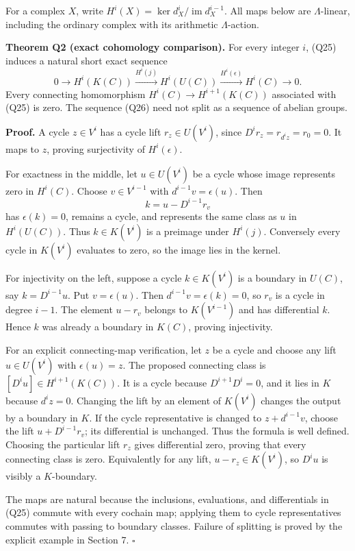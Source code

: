 \documentclass[
]{article}
\begin{document}
For a complex \(X\), write
\(H^i(X)=\ker d_X^i/\operatorname{im}d_X^{i-1}\). All maps below are
\(\Lambda\)-linear, including the ordinary complex with its arithmetic
\(\Lambda\)-action.

\textbf{Theorem Q2 (exact cohomology comparison).} For every integer
\(i\), (Q25) induces a natural short exact sequence \[
0\longrightarrow H^i(K(C))\xrightarrow{H^i(j)}H^i(U(C))
\xrightarrow{H^i(\epsilon)}H^i(C)\longrightarrow0.
\tag{Q26}
\] Every connecting homomorphism \(H^i(C)\to H^{i+1}(K(C))\) associated
with (Q25) is zero. The sequence (Q26) need not split as a sequence of
abelian groups.

\textbf{Proof.} A cycle \(z\in V^i\) has a cycle lift \(r_z\in U(V^i)\),
since \(D^i r_z=r_{d^iz}=r_0=0\). It maps to \(z\), proving surjectivity
of \(H^i(\epsilon)\).

For exactness in the middle, let \(u\in U(V^i)\) be a cycle whose image
represents zero in \(H^i(C)\). Choose \(v\in V^{i-1}\) with
\(d^{i-1}v=\epsilon(u)\). Then \[
k=u-D^{i-1}r_v
\tag{Q27}
\] has \(\epsilon(k)=0\), remains a cycle, and represents the same class
as \(u\) in \(H^i(U(C))\). Thus \(k\in K(V^i)\) is a preimage under
\(H^i(j)\). Conversely every cycle in \(K(V^i)\) evaluates to zero, so
the image lies in the kernel.

For injectivity on the left, suppose a cycle \(k\in K(V^i)\) is a
boundary in \(U(C)\), say \(k=D^{i-1}u\). Put \(v=\epsilon(u)\). Then
\(d^{i-1}v=\epsilon(k)=0\), so \(r_v\) is a cycle in degree \(i-1\). The
element \(u-r_v\) belongs to \(K(V^{i-1})\) and has differential \(k\).
Hence \(k\) was already a boundary in \(K(C)\), proving injectivity.

For an explicit connecting-map verification, let \(z\) be a cycle and
choose any lift \(u\in U(V^i)\) with \(\epsilon(u)=z\). The proposed
connecting class is \([D^iu]\in H^{i+1}(K(C))\). It is a cycle because
\(D^{i+1}D^i=0\), and it lies in \(K\) because \(d^iz=0\). Changing the
lift by an element of \(K(V^i)\) changes the output by a boundary in
\(K\). If the cycle representative is changed to \(z+d^{i-1}v\), choose
the lift \(u+D^{i-1}r_v\); its differential is unchanged. Thus the
formula is well defined. Choosing the particular lift \(r_z\) gives
differential zero, proving that every connecting class is zero.
Equivalently for any lift, \(u-r_z\in K(V^i)\), so \(D^iu\) is visibly a
\(K\)-boundary.

The maps are natural because the inclusions, evaluations, and
differentials in (Q25) commute with every cochain map; applying them to
cycle representatives commutes with passing to boundary classes. Failure
of splitting is proved by the explicit example in Section 7. \(\square\)
\end{document}

